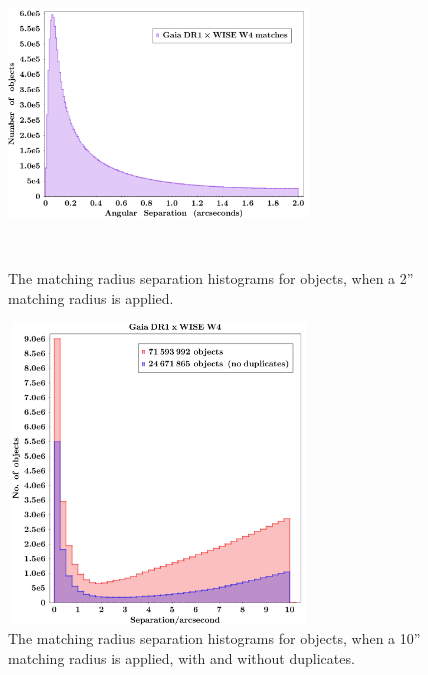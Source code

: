 \documentclass[usenatbib]{mn2e}
\begin{document}
\begin{figure}
   \centering
  \includegraphics[height=8.0cm,width=8.0cm]
 {../../Gaia/plots/GaiaDR1xWISEW4_2as_histo.png}
    \caption[]
    {The matching radius separation histograms for objects, when a 2'' matching radius is applied.}
    \label{fig:fig2}
\end{figure}

\begin{figure}
    \centering
    \includegraphics[height=8.0cm,width=8.0cm]
    {../../Gaia/plots/GaiaDR1xWISEW4_10asDupes_histo.png}
    \caption[The matching radius separation histograms for objects, with and without duplicates.]
    {The matching radius separation histograms for objects, when a 10'' matching radius is applied, with and without duplicates.}
    \label{fig:fig3}
\end{figure}
\end{document}
